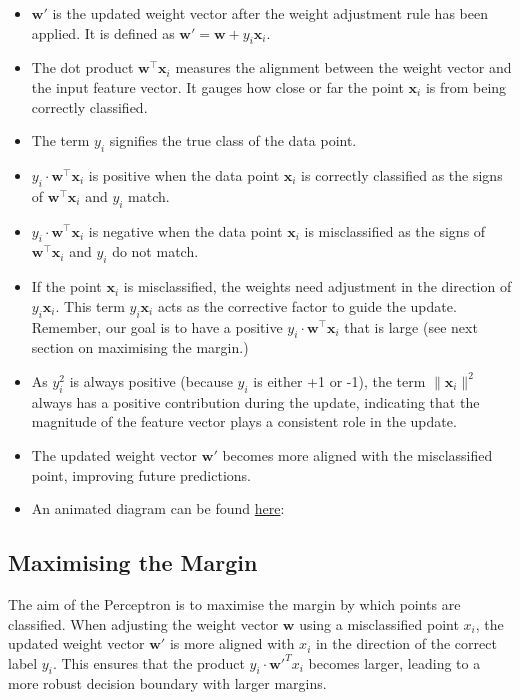 \begin{itemize}
    \item \( \mathbf{w'} \) is the updated weight vector after the weight adjustment rule has been applied. It is defined as \( \mathbf{w'} = \mathbf{w} + y_i\mathbf{x}_i \).
    \item The dot product \( \mathbf{w}^\top\mathbf{x}_i \) measures the alignment between the weight vector and the input feature vector. It gauges how close or far the point \( \mathbf{x}_i \) is from being correctly classified.
    \item The term \( y_i \) signifies the true class of the data point.
     \item \( y_i \cdot \mathbf{w}^\top\mathbf{x}_i \) is positive when the data point \( \mathbf{x}_i \) is correctly classified as the signs of  $\mathbf{w}^\top \mathbf{x}_i$ and $y_i$ match.
    \item \( y_i \cdot \mathbf{w}^\top\mathbf{x}_i \) is negative when the data point \( \mathbf{x}_i \) is misclassified  as the signs of  $\mathbf{w}^\top \mathbf{x}_i$ and $y_i$ do not match.
    \item If the point \( \mathbf{x}_i \) is misclassified, the weights need adjustment in the direction of \( y_i \mathbf{x}_i \). This term \( y_i\mathbf{x}_i \) acts as the corrective factor to guide the update. Remember, our goal is to have a positive  \( y_i \cdot \mathbf{w}^\top\mathbf{x}_i \) that is large (see next section on maximising the margin.)
    \item As \( y_i^2 \) is always positive (because \( y_i \) is either +1 or -1), the term \( \|\mathbf{x}_i\|^2 \) always has a positive contribution during the update, indicating that the magnitude of the feature vector plays a consistent role in the update.
    \item The updated weight vector \( \mathbf{w'} \) becomes more aligned with the misclassified point, improving future predictions.
    \item An animated diagram can be found \href{https://upload.wikimedia.org/wikipedia/commons/a/aa/Perceptron_training_without_bias.gif}{here}:

\end{itemize}


\subsection{Maximising the Margin}
The aim of the Perceptron is to maximise the margin by which points are classified. When adjusting the weight vector \( \mathbf{w} \) using a misclassified point \( x_i \), the updated weight vector \( \mathbf{w'} \) is more aligned with \( x_i \) in the direction of the correct label \( y_i \). This ensures that the product \( y_i \cdot \mathbf{w'}^T x_i \) becomes larger, leading to a more robust decision boundary with larger margins.


